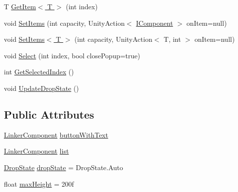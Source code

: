\begin{DoxyCompactItemize}
\item 
T \hyperlink{class_unity_engine_1_1_u_i_1_1_windows_1_1_components_1_1_popup_component_a737c549795131fec66ddc058cf7cf36f}{Get\+Item$<$ T $>$} (int index)
\item 
void \hyperlink{class_unity_engine_1_1_u_i_1_1_windows_1_1_components_1_1_popup_component_aa3c03e1ec27b15582d183c1cf5b09006}{Set\+Items} (int capacity, Unity\+Action$<$ \hyperlink{interface_unity_engine_1_1_u_i_1_1_windows_1_1_components_1_1_i_component}{I\+Component} $>$ on\+Item=null)
\item 
void \hyperlink{class_unity_engine_1_1_u_i_1_1_windows_1_1_components_1_1_popup_component_a0e01efce54b01c7b4b3a1c6715e4e725}{Set\+Items$<$ T $>$} (int capacity, Unity\+Action$<$ T, int $>$ on\+Item=null)
\item 
void \hyperlink{class_unity_engine_1_1_u_i_1_1_windows_1_1_components_1_1_popup_component_a2c21e5574406b5c914e229727c883878}{Select} (int index, bool close\+Popup=true)
\item 
int \hyperlink{class_unity_engine_1_1_u_i_1_1_windows_1_1_components_1_1_popup_component_a5fb0f89864fc30e622d5cadb9667f813}{Get\+Selected\+Index} ()
\item 
void \hyperlink{class_unity_engine_1_1_u_i_1_1_windows_1_1_components_1_1_popup_component_a88be187b0fa6314f0a549572f5b3e392}{Update\+Drop\+State} ()
\end{DoxyCompactItemize}
\subsection*{Public Attributes}
\begin{DoxyCompactItemize}
\item 
\hyperlink{class_unity_engine_1_1_u_i_1_1_windows_1_1_components_1_1_linker_component}{Linker\+Component} \hyperlink{class_unity_engine_1_1_u_i_1_1_windows_1_1_components_1_1_popup_component_aecf4dea9a4ea3aed663ea8d0892bcff7}{button\+With\+Text}
\item 
\hyperlink{class_unity_engine_1_1_u_i_1_1_windows_1_1_components_1_1_linker_component}{Linker\+Component} \hyperlink{class_unity_engine_1_1_u_i_1_1_windows_1_1_components_1_1_popup_component_aeffe7880525d2549c097305bf5b412c8}{list}
\item 
\hyperlink{class_unity_engine_1_1_u_i_1_1_windows_1_1_components_1_1_popup_component_a0cdf218950a065b27ae22c809f6bfb06}{Drop\+State} \hyperlink{class_unity_engine_1_1_u_i_1_1_windows_1_1_components_1_1_popup_component_a136e98d3cd731e62ef50d146bbef179d}{drop\+State} = Drop\+State.\+Auto
\item 
float \hyperlink{class_unity_engine_1_1_u_i_1_1_windows_1_1_components_1_1_popup_component_a1689a910fb5a8e51a2729afe348ee513}{max\+Height} = 200f
\end{DoxyCompactItemize}


